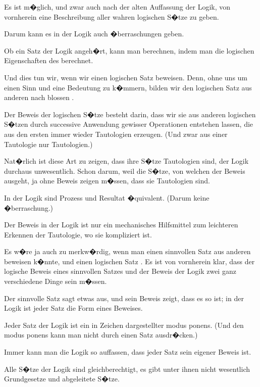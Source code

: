 \begin{propositions}
{Es ist m�glich, und zwar auch nach der alten
Auffassung der Logik, von vornherein eine Beschreibung
aller \glqq{}wahren\grqq{} logischen S�tze zu geben.}


{Darum kann es in der Logik auch  �berraschungen
geben.}


{Ob ein Satz der Logik angeh�rt, kann man
berechnen, indem man die logischen Eigenschaften
des  berechnet.

Und dies tun wir, wenn wir einen logischen
Satz \glqq{}beweisen\grqq{}. Denn, ohne uns um einen Sinn
und eine Bedeutung zu k�mmern, bilden wir den
logischen Satz aus anderen nach blossen .

Der Beweis der logischen S�tze besteht darin,
dass wir sie aus anderen logischen S�tzen durch
successive Anwendung gewisser Operationen entstehen
lassen, die aus den ersten immer wieder
Tautologien erzeugen. (Und zwar  aus
einer Tautologie nur Tautologien.)

Nat�rlich ist diese Art zu zeigen, dass ihre
S�tze Tautologien sind, der Logik durchaus unwesentlich.
Schon darum, weil die S�tze, von
welchen der Beweis ausgeht, ja ohne Beweis zeigen
m�ssen, dass sie Tautologien sind.}


{In der Logik sind Prozess und Resultat �quivalent.
(Darum keine �berraschung.)}


{Der Beweis in der Logik ist nur ein mechanisches
Hilfsmittel zum leichteren Erkennen der
Tautologie, wo sie kompliziert ist.}


{Es w�re ja auch zu merkw�rdig, wenn man
einen sinnvollen Satz  aus anderen beweisen
k�nnte, und einen logischen Satz .
Es ist von vornherein klar, dass der logische
Beweis eines sinnvollen Satzes und der Beweis 
der Logik zwei ganz verschiedene Dinge sein
m�ssen.}


{Der sinnvolle Satz sagt etwas aus, und sein
Beweis zeigt, dass es so ist; in der Logik ist jeder
Satz die Form eines Beweises.

Jeder Satz der Logik ist ein in Zeichen dargestellter
modus ponens. (Und den modus ponens
kann man nicht durch einen Satz ausdr�cken.)}


{Immer kann man die Logik so auffassen, dass
jeder Satz sein eigener Beweis ist.}


{Alle S�tze der Logik sind gleichberechtigt, es
gibt unter ihnen nicht wesentlich Grundgesetze
und abgeleitete S�tze.

}
\end{propositions}
